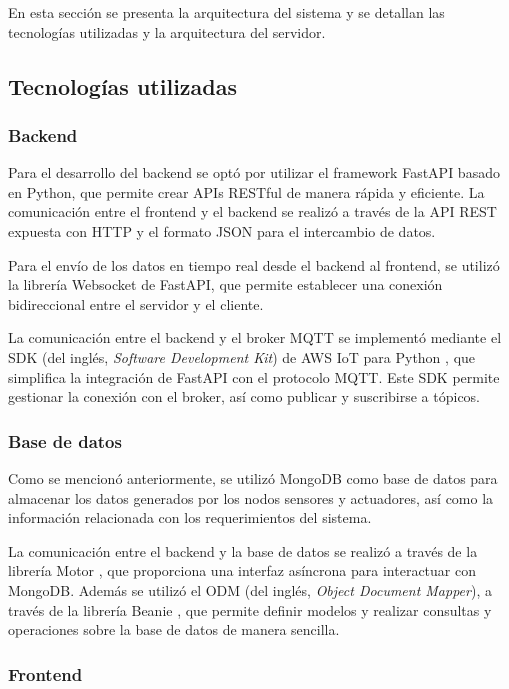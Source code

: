 En esta sección se presenta la arquitectura del sistema y se detallan las
tecnologías utilizadas y la arquitectura del servidor.

\subsection{Tecnologías utilizadas}

\subsubsection{Backend}

Para el desarrollo del backend se optó por utilizar el framework FastAPI basado
en Python, que permite crear APIs RESTful de manera rápida y eficiente. La
comunicación entre el frontend y el backend se realizó a través de la API REST
expuesta con HTTP y el formato JSON para el intercambio de datos.

Para el envío de los datos en tiempo real desde el backend al frontend, se
utilizó la librería Websocket \cite{FastAPIWebSockets} de FastAPI, que permite
establecer una conexión bidireccional entre el servidor y el cliente.

La comunicación entre el backend y el broker MQTT se implementó mediante el SDK
(del inglés, \textit{Software Development Kit}) de AWS IoT para Python
\cite{AWSIoTSDK}, que simplifica la integración de FastAPI con el protocolo
MQTT. Este SDK permite gestionar la conexión con el broker, así como publicar y
suscribirse a tópicos.

\subsubsection{Base de datos}

Como se mencionó anteriormente, se utilizó MongoDB como base de datos para
almacenar los datos generados por los nodos sensores y actuadores, así como la
información relacionada con los requerimientos del sistema.

La comunicación entre el backend y la base de datos se realizó a través de la
librería Motor \cite{MotorMongoDB}, que proporciona una interfaz asíncrona para
interactuar con MongoDB. Además se utilizó el ODM (del inglés, \textit{Object
    Document Mapper}), a través de la librería Beanie \cite{BeaniODM}, que permite
definir modelos y realizar consultas y operaciones sobre la base de datos de
manera sencilla.

\subsubsection{Frontend}

